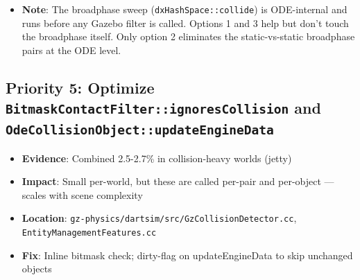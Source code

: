 \documentclass[11pt, a4paper]{article}
\providecommand{\tightlist}{%
  \setlength{\itemsep}{0pt}\setlength{\parskip}{0pt}}
\begin{document}
\begin{itemize}
  \begin{enumerate}
  \def\labelenumi{\arabic{enumi}.}
  \tightlist
  \item
    \textbf{Quick win --- filter static-vs-static in
    \texttt{BitmaskContactFilter::ignoresCollision}}: Add an
    early-return when both bodies belong to immobile skeletons (DART
    already exposes \texttt{Skeleton::isMobile()}). This skips
    narrowphase and contact generation for static-vs-static pairs but
    doesn't eliminate the broadphase sweep itself.
  \item
    \textbf{Architectural --- separate collision groups}: Create two
    collision groups: one for dynamic bodies, one for static. Run
    broadphase as dynamic-vs-dynamic and dynamic-vs-static only,
    skipping static-vs-static entirely. This would require changes to
    how gz-physics constructs and manages DART collision groups, and
    would need to handle bodies transitioning between static and
    dynamic.
  \item
    \textbf{Full-static shortcut}: In \texttt{WorldForwardStep}, if all
    bodies in the world are static, skip
    \texttt{world-\textgreater{}step()} entirely. Edge case but cheap to
    implement.
  \end{enumerate}
\item
  \textbf{Note}: The broadphase sweep (\texttt{dxHashSpace::collide}) is
  ODE-internal and runs before any Gazebo filter is called. Options 1
  and 3 help but don't touch the broadphase itself. Only option 2
  eliminates the static-vs-static broadphase pairs at the ODE level.
\end{itemize}

\hypertarget{priority-3-optimize-bitmaskcontactfilterignorescollision-and-odecollisionobjectupdateenginedata}{%
\subsection{\texorpdfstring{Priority 5: Optimize
\texttt{BitmaskContactFilter::ignoresCollision} and
\texttt{OdeCollisionObject::updateEngineData}}{Priority 3: Optimize BitmaskContactFilter::ignoresCollision and OdeCollisionObject::updateEngineData}}\label{priority-3-optimize-bitmaskcontactfilterignorescollision-and-odecollisionobjectupdateenginedata}}

\begin{itemize}
\tightlist
\item
  \textbf{Evidence}: Combined 2.5-2.7\% in collision-heavy worlds
  (jetty)
\item
  \textbf{Impact}: Small per-world, but these are called per-pair and
  per-object --- scales with scene complexity
\item
  \textbf{Location}:
  \texttt{gz-physics/dartsim/src/GzCollisionDetector.cc},
  \texttt{EntityManagementFeatures.cc}
\item
  \textbf{Fix}: Inline bitmask check; dirty-flag on updateEngineData to
  skip unchanged objects
\end{itemize}
\end{document}
